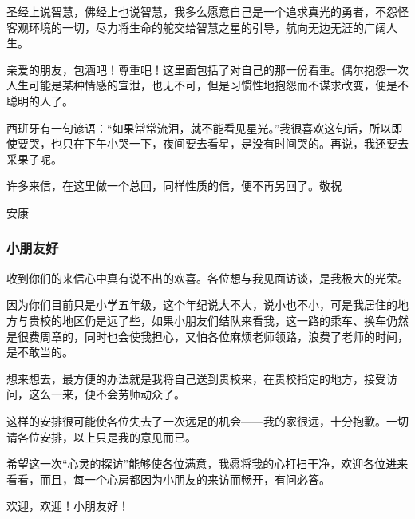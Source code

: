 \par 圣经上说智慧，佛经上也说智慧，我多么愿意自己是一个追求真光的勇者，不怨怪客观环境的一切，尽力将生命的舵交给智慧之星的引导，航向无边无涯的广阔人生。
\par 亲爱的朋友，包涵吧！尊重吧！这里面包括了对自己的那一份看重。偶尔抱怨一次人生可能是某种情感的宣泄，也无不可，但是习惯性地抱怨而不谋求改变，便是不聪明的人了。
\par 西班牙有一句谚语：“如果常常流泪，就不能看见星光。”我很喜欢这句话，所以即使要哭，也只在下午小哭一下，夜间要去看星，是没有时间哭的。再说，我还要去采果子呢。
\par 许多来信，在这里做一个总回，同样性质的信，便不再另回了。敬祝
\par 安康
\par {}


\subsubsection{小朋友好}


\par {}
\par {}
\par 收到你们的来信心中真有说不出的欢喜。各位想与我见面访谈，是我极大的光荣。
\par 因为你们目前只是小学五年级，这个年纪说大不大，说小也不小，可是我居住的地方与贵校的地区仍是远了些，如果小朋友们结队来看我，这一路的乘车、换车仍然是很费周章的，同时也会使我担心，又怕各位麻烦老师领路，浪费了老师的时间，是不敢当的。
\par 想来想去，最方便的办法就是我将自己送到贵校来，在贵校指定的地方，接受访问，这么一来，便不会劳师动众了。
\par 这样的安排很可能使各位失去了一次远足的机会——我的家很远，十分抱歉。一切请各位安排，以上只是我的意见而已。
\par 希望这一次“心灵的探访”能够使各位满意，我愿将我的心打扫干净，欢迎各位进来看看，而且，每一个心房都因为小朋友的来访而畅开，有问必答。
\par 欢迎，欢迎！小朋友好！
\par {}


